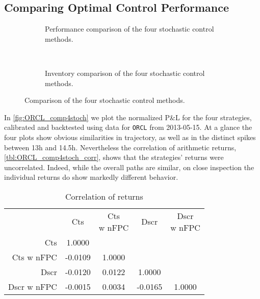 \FloatBarrier
\subsection{Comparing Optimal Control Performance}

\begin{figure}
  \centering
\begin{subfigure}{\linewidth}
  \setlength{} 
  \setlength\figurewidth{\linewidth}
  
  \caption{Performance comparison of the four stochastic control methods.}
  \label{fig:ORCL_comp4stoch}
\end{subfigure}\\
\vspace{1cm}
\begin{subfigure}{\linewidth}
  \centering
  \setlength{} 
  \setlength\figurewidth{\linewidth}
  
  \caption{Inventory comparison of the four stochastic control methods.}
  \label{fig:ORCL_comp4stoch_inv}
\end{subfigure}%
\caption{Comparison of the four stochastic control methods.}
\end{figure}
In \autoref{fig:ORCL_comp4stoch} we plot the normalized P\&L for the four strategies, calibrated and backtested using data for \texttt{ORCL} from 2013-05-15. At a glance the four plots show obvious similarities in trajectory, as well as in the distinct spikes between 13h and 14.5h. Nevertheless the correlation of arithmetic returns, \autoref{tbl:ORCL_comp4stoch_corr}, shows that the strategies' returns were uncorrelated. Indeed, while the overall paths are similar, on close inspection the individual returns do show markedly different behavior.
\begin{table}[H]
\centering
{}
\begin{tabular}{@{} r *{4}{c} @{}}
\toprule
& Cts & \cellbreak{t}{c}{Cts \\ w nFPC} & Dscr & \cellbreak{t}{c}{Dscr \\ w nFPC} \\
\cmidrule{2-5}
Cts          &  1.0000  & & & \\
Cts w nFPC   & -0.0109  &  1.0000 &  & \\
Dscr         & -0.0120  &  0.0122 &   1.0000 &  \\
Dscr w nFPC  & -0.0015  &  0.0034 &  -0.0165 &   1.0000 \\
\bottomrule
\end{tabular}
\caption{Correlation of returns}
\label{tbl:ORCL_comp4stoch_corr}
\end{table}
